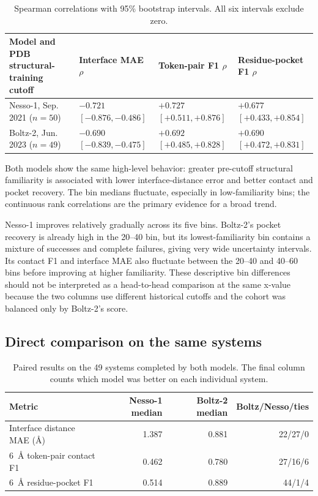 \documentclass[11pt]{article}
\begin{document}
\begin{table}[H]
\centering
\small
\begin{tabular}{L{0.25\textwidth}L{0.21\textwidth}L{0.21\textwidth}L{0.21\textwidth}}
\toprule
Model and PDB structural-training cutoff & Interface MAE $\rho$ & Token-pair F1 $\rho$ & Residue-pocket F1 $\rho$ \\
\midrule
Nesso-1, Sep. 2021 ($n=50$) & $-0.721$ $[-0.876,-0.486]$ & $+0.727$ $[+0.511,+0.876]$ & $+0.677$ $[+0.433,+0.854]$ \\
Boltz-2, Jun. 2023 ($n=49$) & $-0.690$ $[-0.839,-0.475]$ & $+0.692$ $[+0.485,+0.828]$ & $+0.690$ $[+0.472,+0.831]$ \\
\bottomrule
\end{tabular}
\caption{Spearman correlations with 95\% bootstrap intervals. All six
intervals exclude zero.}
\end{table}

Both models show the same high-level behavior: greater pre-cutoff structural
familiarity is associated with lower interface-distance error and better
contact and pocket recovery. The bin medians fluctuate, especially in low-familiarity bins;
the continuous rank correlations are the primary evidence for a broad trend.

Nesso-1 improves relatively gradually across its
five bins. Boltz-2's pocket recovery is already high in the 20--40 bin, but its
lowest-familiarity bin contains a mixture of successes and complete failures,
giving very wide uncertainty intervals. Its contact F1 and interface MAE also
fluctuate between the 20--40 and 40--60 bins before improving at higher
familiarity. These descriptive bin differences should not be interpreted as a
head-to-head comparison at the same x-value because the two columns use
different historical cutoffs and the cohort was balanced only by Boltz-2's
score.


\subsection{Direct comparison on the same systems}

\begin{table}[H]
\centering
\small
\begin{tabular}{L{0.31\textwidth}rrr}
\toprule
Metric & Nesso-1 median & Boltz-2 median & Boltz/Nesso/ties \\
\midrule
Interface distance MAE (\AA) & 1.387 & 0.881 & 22/27/0 \\
6~\AA{} token-pair contact F1 & 0.462 & 0.780 & 27/16/6 \\
6~\AA{} residue-pocket F1 & 0.514 & 0.889 & 44/1/4 \\
\bottomrule
\end{tabular}
\caption{Paired results on the 49 systems completed by both models. The final
column counts which model was better on each individual system.}
\end{table}
\end{document}
